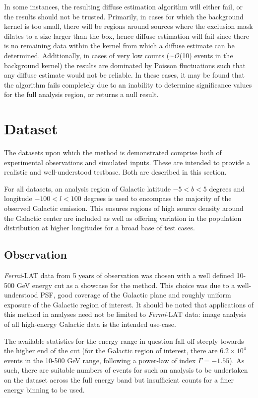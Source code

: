 \documentclass{PoS}
\begin{document}
In some instances, the resulting diffuse estimation algorithm will either fail, or the results should not be trusted. Primarily, in cases for which the background kernel is too small, there will be regions around sources where the exclusion mask dilates to a size larger than the box, hence diffuse estimation will fail since there is no remaining data within the kernel from which a diffuse estimate can be determined. Additionally, in cases of very low counts (\textbf{$\sim\mathcal{O}$}(10) events in the background kernel) the results are dominated by Poisson fluctuations such that any diffuse estimate would not be reliable. In these cases, it may be found that the algorithm fails completely due to an inability to determine significance values for the full analysis region, or returns a null result.

\section{Dataset}

The datasets upon which the method is demonstrated comprise both of experimental observations and simulated inputs. These are intended to provide a realistic and well-understood testbase. Both are described in this section.

For all datasets, an analysis region of Galactic latitude $-5 < b < 5$ degrees and longitude $-100 < l < 100$ degrees is used to encompass the majority of the observed Galactic emission. This ensures regions of high source density around the Galactic center are included as well as offering variation in the population distribution at higher longitudes for a broad base of test cases.


\subsection{Observation}

\textit{Fermi}-LAT data from 5 years of observation was chosen with a well defined 10-500 GeV energy cut as a showcase for the method. This choice was due to a well-understood PSF, good coverage of the Galactic plane and roughly uniform exposure of the Galactic region of interest. It should be noted that applications of this method in analyses need not be limited to \textit{Fermi}-LAT data: image analysis of all high-energy Galactic data is the intended use-case.

The available statistics for the energy range in question fall off steeply towards the higher end of the cut (for the Galactic region of interest, there are $6.2 \times 10^4$ events in the 10-500 GeV range, following a power-law of index $\Gamma = -1.55$). As such, there are suitable numbers of events for such an analysis to be undertaken on the dataset across the full energy band but insufficient counts for a finer energy binning to be used.
\end{document}
